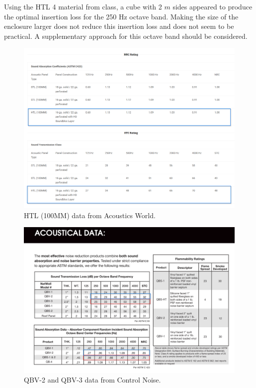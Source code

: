 {{\vspace{0.25cm}
Using the HTL 4 material from class, a cube with 2 $m$ sides appeared to produce the optimal insertion loss for the 250 Hz octave band.  Making the size of the enclosure larger does not reduce this insertion loss and does not seem to be practical.  A supplementary approach for this octave band should be considered.

\begin{figure}[htbp]
    \center
    \includegraphics[scale=0.5]{Q5 AW Data.png}
    \caption{HTL (100MM) data from Acoustics World.}
    \label{figure:q5AWcaseData}
\end{figure}

\begin{figure}[htbp]
    \center
    \includegraphics[scale=0.5]{Q5 NW Data.png}
    \caption{QBV-2 and QBV-3 data from Control Noise.}
    \label{figure:q5CNcaseData}
\end{figure}






}}
